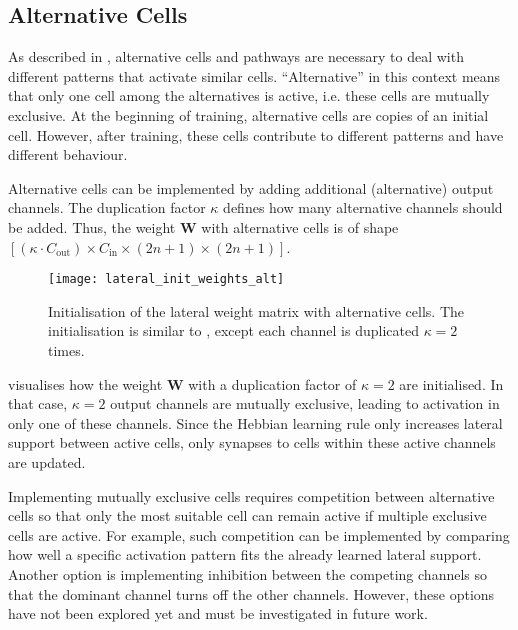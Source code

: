 \subsection{Alternative Cells}
As described in , alternative cells and pathways are necessary to deal with different patterns that activate similar cells.
``Alternative'' in this context means that only one cell among the alternatives is active, i.e. these cells are mutually exclusive.
At the beginning of training, alternative cells are copies of an initial cell.
However, after training, these cells contribute to different patterns and have different behaviour.

Alternative cells can be implemented by adding additional (alternative) output channels.
The duplication factor $\kappa$ defines how many alternative channels should be added.
Thus, the weight $\boldsymbol{W}$ with alternative cells is of shape $\left[(\kappa \cdot C_{\text{out}}) \times C_{\text{in}} \times (2n+1) \times (2n+1)\right]$.

\begin{figure}[h]
    \centering
    \texttt{[image: lateral\_init\_weights\_alt]}
    \caption[Initialisation of the lateral weight matrix with alternative cells]{Initialisation of the lateral weight matrix with alternative cells. The initialisation is similar to , except each channel is duplicated $\kappa=2$ times.}
\end{figure}

 visualises how the weight $\boldsymbol{W}$ with a duplication factor of $\kappa=2$ are initialised.
In that case, $\kappa=2$ output channels are mutually exclusive, leading to activation in only one of these channels.
Since the Hebbian learning rule only increases lateral support between active cells, only synapses to cells within these active channels are updated.

Implementing mutually exclusive cells requires competition between alternative cells so that only the most suitable cell can remain active if multiple exclusive cells are active.
For example, such competition can be implemented by comparing how well a specific activation pattern fits the already learned lateral support.
Another option is implementing inhibition between the competing channels so that the dominant channel turns off the other channels.
However, these options have not been explored yet and must be investigated in future work.


